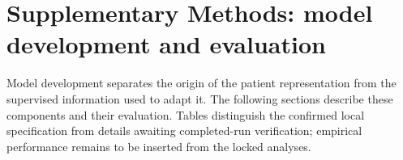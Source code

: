 \documentclass[11pt]{article}
\begin{document}
\noindent{}\par\medskip

\ifdefined\embeddedSupplement\pagestyle{empty}\fi
\section*{Supplementary Methods: model development and evaluation}
Model development separates the origin of the patient representation from the
supervised information used to adapt it. The following sections describe these
components and their evaluation. Tables distinguish the confirmed local
specification from details awaiting completed-run verification; empirical
performance remains to be inserted from the locked analyses.
\tableofcontents
\end{document}
